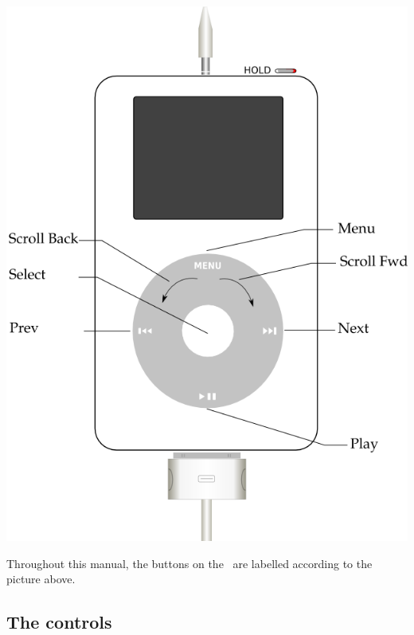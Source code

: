 \begin{center}
{    {\includegraphics{rockbox_interface/images/ipod4g-front.png}}
 }
\end{center}

Throughout this manual, the buttons on the \dap\ are labelled according to the
picture above.

\subsection{The \daps{} controls}

